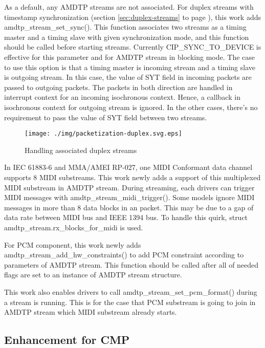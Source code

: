 \documentclass[onecolumn]{article}
\begin{document}
As a default, any AMDTP streams are not associated. For duplex streams with timestamp synchronization (section \ref{sec:duplex-streams} to page \pageref{sec:duplex-streams}), this work adds amdtp\_stream\_set\_sync(). This function associates two streams as a timing master and a timing slave with given synchronization mode, and this function should be called before starting streams. Currently CIP\_SYNC\_TO\_DEVICE is effective for this parameter and for AMDTP stream in blocking mode. The case to use this option is that a timing master is incoming stream and a timing slave is outgoing stream. In this case, the value of SYT field in incoming packets are passed to outgoing packets. The packets in both direction are handled in interrupt context for an incoming isochronous context. Hence, a callback in isochronous context for outgoing stream is ignored. In the other cases, there's no requirement to pass the value of SYT field between two streams.

\begin{figure}[H]
	\centering
	\texttt{[image: ./img/packetization-duplex.svg.eps]}
	\caption{{Handling associated duplex streams}}
	\label{fig:packetization-duplex}
\end{figure}


In IEC 61883-6\cite{iec61883-6-1, iec61883-6-2} and MMA/AMEI RP-027\cite{amei-rp27}, one MIDI Conformant data channel supports 8 MIDI substreams. This work newly adds a support of this multiplexed MIDI substream in AMDTP stream. During streaming, each drivers can trigger MIDI messages with amdtp\_stream\_midi\_trigger(). Some models ignore MIDI messages in more than 8 data blocks in an packet. This may be due to a gap of data rate between MIDI bus and IEEE 1394 bus. To handle this quirk, struct amdtp\_stream.rx\_blocks\_for\_midi is used.

For PCM component, this work newly adds amdtp\_stream\_add\_hw\_constraints() to add PCM constraint according to parameters of AMDTP stream. This function should be called after all of needed flags are set to an instance of AMDTP stream structure.

This work also enables drivers to call amdtp\_stream\_set\_pcm\_format() during a stream is running. This is for the case that PCM substream is going to join in AMDTP stream which MIDI substream already starts.

\subsection{Enhancement for CMP}
\end{document}
